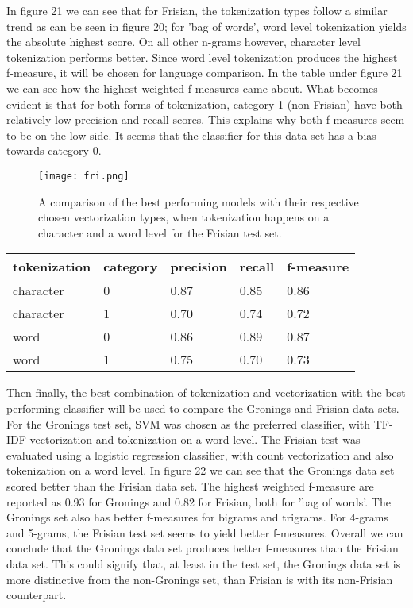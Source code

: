 \documentclass[
10pt, %
a4paper, %
oneside, %
headinclude,footinclude, %
] {book}%
\begin{document}
In figure 21 we can see that for Frisian, the tokenization types follow a similar trend as can be seen in figure 20; for 'bag of words', word level tokenization yields the absolute highest score. On all other n-grams however, character level tokenization performs better. Since word level tokenization produces the highest f-measure, it will be chosen for language comparison. In the table under figure 21 we can see how the highest weighted f-measures came about. What becomes evident is that for both forms of tokenization, category 1 (non-Frisian) have both relatively low precision and recall scores. This explains why both f-measures seem to be on the low side. It seems that the classifier for this data set has a bias towards category 0.

\begin{figure}[H]
  \texttt{[image: fri.png]}
  \caption{A comparison of the best performing models with their respective chosen vectorization types, when tokenization happens on a character and a word level for the Frisian test set.}
\end{figure} 

\begin{table}[H]
   
    \begin{tabular}{lllll}
    tokenization & category & precision & recall & f-measure \\ \hline
    character & 0 & 0.87      & 0.85   & 0.86   \\
    character & 1 & 0.70      & 0.74   & 0.72      \\ \hline
    word & 0 & 0.86      & 0.89   & 0.87      \\
    word & 1 & 0.75      & 0.70   & 0.73    \\ \hline

    \end{tabular}
  
\end{table}

Then finally, the best combination of tokenization and vectorization with the best performing classifier will be used to compare the Gronings and Frisian data sets. For the Gronings test set, SVM was chosen as the preferred classifier, with TF-IDF vectorization and tokenization on a word level. The Frisian test was evaluated using a logistic regression classifier, with count vectorization and also tokenization on a word level. In figure 22 we can see that the Gronings data set scored better than the Frisian data set. The highest weighted f-measure are reported as 0.93 for Gronings and 0.82 for Frisian, both for 'bag of words'. The Gronings set also has better f-measures for bigrams and trigrams. For 4-grams and 5-grams, the Frisian test set seems to yield better f-measures. Overall we can conclude that the Gronings data set produces better f-measures than the Frisian data set. This could signify that, at least in the test set, the Gronings data set is more distinctive from the non-Gronings set, than Frisian is with its non-Frisian counterpart. 
\end{document}
